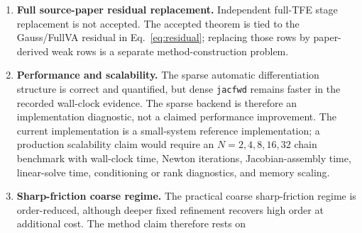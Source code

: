 \documentclass[preprint,12pt]{elsarticle}
\newcommand{\tfe}{TFE}
\begin{document}
\begin{enumerate}
  theorem requires a compact-tube nonlinear residual policy
  \(\eta_h^{\rm tube}\le c_\eta h^7\), while the
  reported production runs use a fixed finite-run tolerance. The current
  scaled-tolerance and tolerance-regime probes are finite reported-window
  diagnostics around this policy; they diagnose this scale but do not close
  it, prove an asymptotic solver contract, or convert fixed production
  tolerances into theorem hypotheses. Likewise, endpoint closure is a conditional
  local \(O(h^7)\) perturbation under Lemma~\ref{lem:endpoint-closure}
  and the retained P2 endpoint-ball/right-inverse hypotheses; the raw
  residual/correction rows do not prove those retained hypotheses and are
  not hidden source-paper or reference-solution projections.
  Closing P6 rather than retaining it would require a theorem-level solver
  result on the same compact tube: the Gauss-predictor branch would have to
  be selected for every accepted transition, the computed Newton iterate would
  have to remain in the strong local residual-inverse ball, and the
  \(h^7\)-scaled residual stopping rule would have to hold uniformly with
  constants independent of the reported grid and backend. Such a result would
  discharge the solver-scale interface only; it would still not promote
  residual-only mechanism rows unless the separate P7 residual-to-error
  transfer theorem were also proved.
  \item \textbf{Full source-paper residual replacement.} Independent
  full-\tfe{} stage replacement is not accepted. The accepted theorem is tied
  to the Gauss/FullVA residual in Eq.~\eqref{eq:residual}; replacing those rows
  by paper-derived weak rows is a separate method-construction problem.
  \item \textbf{Performance and scalability.} The sparse automatic
  differentiation structure is correct and quantified, but dense
  \texttt{jacfwd} remains faster in the recorded wall-clock evidence. The
  sparse backend is therefore an implementation diagnostic, not a claimed
  performance improvement. The current implementation is a small-system
  reference implementation; a production scalability claim would require an
  $N=2,4,8,16,32$ chain benchmark with wall-clock time, Newton iterations,
  Jacobian-assembly time, linear-solve time, conditioning or rank diagnostics,
  and memory scaling.
  \item \textbf{Sharp-friction coarse regime.} The practical coarse
  sharp-friction regime is order-reduced, although deeper fixed refinement
  recovers high order at additional cost. The method claim therefore rests on

\end{enumerate}
\end{document}
